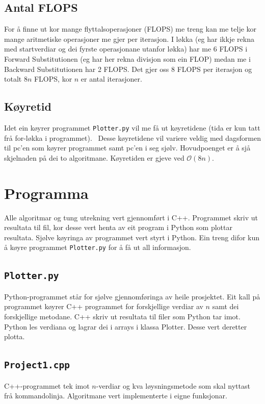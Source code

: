 \documentclass[11pt, a4paper]{article}
\begin{document}
  \subsection{Antal FLOPS}
    For å finne ut kor mange flyttalsoperasjoner (FLOPS) me treng kan me telje kor mange 
    aritmetiske operasjoner me gjer per iterasjon. I løkka (eg har ikkje rekna med startverdiar og 
    dei fyrste operasjonane utanfor løkka) har me 6 FLOPS i Forward Substitutionen (eg har her 
    rekna divisjon som ein FLOP) medan me i Backward Substitutionen har 2 FLOPS. Det gjer oss 8 FLOPS 
    per iterasjon og totalt $8n$ FLOPS, kor $n$ er antal iterasjoner.


  \subsection{Køyretid}
    Idet ein køyrer programmet \texttt{Plotter.py} vil me få ut køyretidene (tida er kun tatt frå
    for-løkka i programmet).
     \
    Desse køyretidene vil variere veldig med dagsformen til pc'en som køyrer programmet samt
    pc'en i seg sjølv. Hovudpoenget er å sjå skjelnaden på dei to algoritmane.
    Køyretiden er gjeve ved $\mathcal{O}(8n)$.

\section{Programma}
  Alle algoritmar og tung utrekning vert gjennomført i C++. Programmet skriv ut resultata til fil,
  kor desse vert henta av eit program i Python som plottar resultata. Sjølve køyringa av programmet 
  vert styrt i Python. Ein treng difor kun å køyre programmet \texttt{Plotter.py} for å få ut all
  informasjon. 

  \subsection{\texttt{Plotter.py}}
    Python-programmet står for sjølve gjennomføringa av heile prosjektet. Eit kall på 
    programmet køyrer C++ programmet for forskjellige verdiar av $n$ samt dei forskjellige
    metodane. C++ skriv ut resultata til filer som Python tar imot. Python les verdiana og lagrar dei
    i arrays i klassa Plotter. Desse vert deretter plotta.
   
  \subsection{\texttt{Project1.cpp}}
    C++-programmet tek imot $n$-verdiar og kva løysningsmetode som skal nyttast frå kommandolinja.
    Algoritmane vert implementerte i eigne funksjonar.
\end{document}
